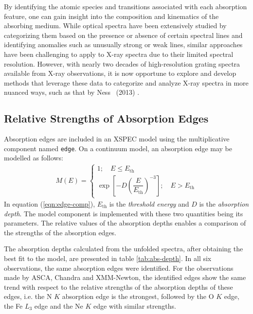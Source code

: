 		    By identifying the atomic species and transitions associated with each absorption feature, one can gain insight into the composition and kinematics of the absorbing medium. While optical spectra have been extensively studied by categorizing them based on the presence or absence of certain spectral lines and identifying anomalies such as unusually strong or weak lines, similar approaches have been challenging to apply to X-ray spectra due to their limited spectral resolution. However, with nearly two decades of high-resolution grating spectra available from X-ray observations, it is now opportune to explore and develop methods that leverage these data to categorize and analyze X-ray spectra in more nuanced ways, such as that by Ness \etal\ (2013) \cite{ness2013obscuration}.
    	
    	\subsection{Relative Strengths of Absorption Edges} \label{multi-obs:discussion:abs-edge-strength}
    		Absorption edges are included in an XSPEC model using the multiplicative component named \texttt{edge}. On a continuum model, an absorption edge may be modelled as follows:
		    \begin{align}
		    	M(E)=\begin{cases}
		    		{1;\quad E\leqslant E_\text{th}} \\
		    		{\exp{\left[ -D\left(\dfrac{E}{E_\text{th}}\right)^{-3} \right]};\quad E> E_\text{th}}
		    	\end{cases} \label{eqn:edge-comp}
		    \end{align}
		    In equation (\ref{eqn:edge-comp}), $E_\text{th}$ is the \textit{threshold energy} and $D$ is the \textit{absorption depth}. The model component is implemented with these two quantities being its parameters. The relative values of the absorption depths enables a comparison of the strengths of the absorption edges.
		    
		    The absorption depths calculated from the unfolded spectra, after obtaining the best fit to the model, are presented in table \ref{tab:abs-depth}. In all six observations, the same absorption edges were identified. For the observations made by ASCA, Chandra and XMM-Newton, the identified edges show the same trend with respect to the relative strengths of the absorption depths of these edges, i.e. the N $K$ absorption edge is the strongest, followed by the O $K$ edge, the Fe $L_3$ edge and the Ne $K$ edge with similar strengths.
		    

